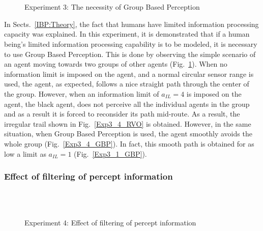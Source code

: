 \begin{figure}[!t]
  \centering
   \\
    \hspace{1pt}
  \\
  \hspace{1pt}
  \caption{Experiment 3: The necessity of Group Based Perception}
  \label{Exp3}
\end{figure}

In Sects.~\ref{IBP:Theory}, the fact that humans have limited information processing capacity was explained. In this experiment, it is demonstrated that if a human being's limited information processing capability is to be modeled, it is necessary to use Group Based Perception. This is done by observing the simple scenario of an agent moving towards two groups of other agents (Fig.~\ref{Exp3}). When no information limit is imposed on the agent, and a normal circular sensor range is used, the agent, as expected, follows a nice straight path through the center of the group. However, when an information limit of $a_{IL} = 4$ is imposed on the agent, the black agent, does not perceive all the individual agents in the group and  as a result it is forced to reconsider its path mid-route. As a result, the irregular trail shown in Fig.~\ref{Exp3_4_RVO} is obtained. However, in the same situation, when Group Based Perception is used, the agent smoothly avoids the whole group (Fig.~\ref{Exp3_4_GBP}). In fact, this smooth path is obtained for as low a limit as $a_{IL} = 1$ (Fig.~\ref{Exp3_1_GBP}).

\subsubsection{Effect of filtering of percept information}

\begin{figure}[!tb]
  \centering
   \\
  \hspace{1pt}
  \\
  \hspace{1pt}
  \caption{Experiment 4: Effect of filtering of percept information}
  \label{Exp4}
\end{figure}

